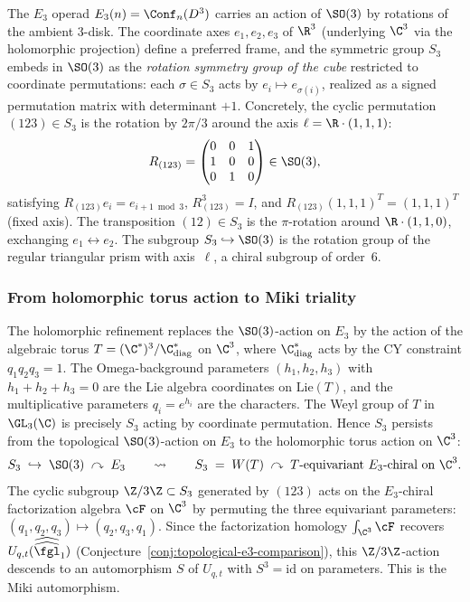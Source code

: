 The $E_3$ operad $E_3(n) = \Conf_n(D^3)$ carries an action of $\SO(3)$ by rotations of the ambient $3$-disk. The coordinate axes $e_1, e_2, e_3$ of $\R^3$ (underlying $\C^3$ via the holomorphic projection) define a preferred frame, and the symmetric group $S_3$ embeds in $\SO(3)$ as the \emph{rotation symmetry group of the cube} restricted to coordinate permutations: each $\sigma \in S_3$ acts by $e_i \mapsto e_{\sigma(i)}$, realized as a signed permutation matrix with determinant $+1$. Concretely, the cyclic permutation $(123) \in S_3$ is the rotation by $2\pi/3$ around the axis $\ell = \R \cdot (1,1,1)$:
\[
 R_{(123)} = \begin{pmatrix} 0 & 0 & 1 \\ 1 & 0 & 0 \\ 0 & 1 & 0 \end{pmatrix} \in \SO(3),
\]
satisfying $R_{(123)} e_i = e_{i+1 \bmod 3}$, $R_{(123)}^3 = I$, and $R_{(123)}(1,1,1)^T = (1,1,1)^T$ (fixed axis). The transposition $(12) \in S_3$ is the $\pi$-rotation around $\R \cdot (1,1,0)$, exchanging $e_1 \leftrightarrow e_2$. The subgroup $S_3 \hookrightarrow \SO(3)$ is the rotation group of the regular triangular prism with axis~$\ell$, a chiral subgroup of order~$6$.

\subsubsection{From holomorphic torus action to Miki triality}

The holomorphic refinement replaces the $\SO(3)$-action on $E_3$ by the action of the algebraic torus $T = (\C^*)^3/\C^*_{\mathrm{diag}}$ on $\C^3$, where $\C^*_{\mathrm{diag}}$ acts by the CY constraint $q_1 q_2 q_3 = 1$. The Omega-background parameters $(h_1, h_2, h_3)$ with $h_1 + h_2 + h_3 = 0$ are the Lie algebra coordinates on $\mathrm{Lie}(T)$, and the multiplicative parameters $q_i = e^{h_i}$ are the characters. The Weyl group of $T$ in $\GL_3(\C)$ is precisely $S_3$ acting by coordinate permutation. Hence $S_3$ persists from the topological $\SO(3)$-action on $E_3$ to the holomorphic torus action on $\C^3$:
\[
 S_3 \;\hookrightarrow\; \SO(3) \;\curvearrowright\; E_3 \qquad \leadsto \qquad
 S_3 \;=\; W(T) \;\curvearrowright\; T\text{-equivariant } E_3\text{-chiral on } \C^3.
\]
The cyclic subgroup $\Z/3\Z \subset S_3$ generated by $(123)$ acts on the $E_3$-chiral factorization algebra $\cF$ on $\C^3$ by permuting the three equivariant parameters: $(q_1, q_2, q_3) \mapsto (q_2, q_3, q_1)$. Since the factorization homology $\int_{\C^3} \cF$ recovers $U_{q,t}(\widehat{\widehat{\fgl}}_1)$ (Conjecture~\ref{conj:topological-e3-comparison}), this $\Z/3\Z$-action descends to an automorphism $S$ of $U_{q,t}$ with $S^3 = \mathrm{id}$ on parameters. This is the Miki automorphism.


